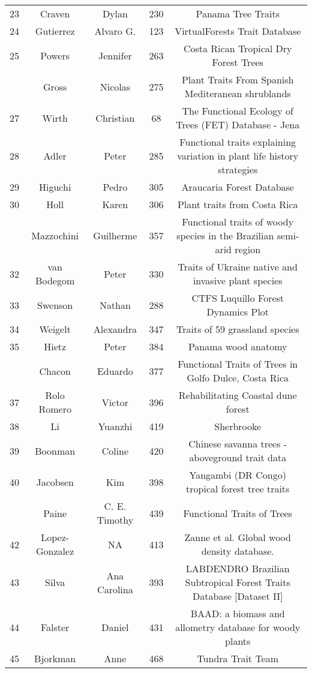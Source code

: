 \documentclass[
  12pt,
  letterpaper,
  DIV=11,
  numbers=noendperiod]{scrartcl}
\begin{document}
\begin{longtable*}[t]{ccccc}
23 & Craven & Dylan & 230 & Panama Tree Traits\\
24 & Gutierrez & Alvaro G. & 123 & VirtualForests Trait Database\\
25 & Powers & Jennifer & 263 & Costa Rican Tropical Dry Forest Trees\\
 & Gross & Nicolas & 275 & Plant Traits From Spanish Mediteranean shrublands\\
27 & Wirth & Christian & 68 & The Functional Ecology of Trees (FET) Database  - Jena\\
28 & Adler & Peter & 285 & Functional traits explaining variation in plant life history strategies\\
29 & Higuchi & Pedro & 305 & Araucaria Forest Database\\
30 & Holl & Karen & 306 & Plant traits from Costa Rica\\
 & Mazzochini & Guilherme & 357 & Functional traits of woody species in the Brazilian semi-arid region\\
32 & van Bodegom & Peter & 330 & Traits of Ukraine native and invasive plant species\\
33 & Swenson & Nathan & 288 & CTFS Luquillo Forest Dynamics Plot\\
34 & Weigelt & Alexandra & 347 & Traits of 59 grassland species\\
35 & Hietz & Peter & 384 & Panama wood anatomy\\
 & Chacon & Eduardo & 377 & Functional Traits of Trees in Golfo Dulce, Costa Rica\\
37 & Rolo Romero & Victor & 396 & Rehabilitating Coastal dune forest\\
38 & Li & Yuanzhi & 419 & Sherbrooke\\
39 & Boonman & Coline & 420 & Chinese savanna trees - aboveground trait data\\
40 & Jacobsen & Kim & 398 & Yangambi (DR Congo) tropical forest tree traits\\
 & Paine & C. E. Timothy & 439 & Functional Traits of Trees\\
42 & Lopez-Gonzalez & NA & 413 & Zanne et al. Global wood density database.\\
43 & Silva & Ana Carolina & 393 & LABDENDRO Brazilian Subtropical Forest Traits Database [Dataset II]\\
44 & Falster & Daniel & 431 & BAAD: a biomass and allometry database for woody plants\\
45 & Bjorkman & Anne & 468 & Tundra Trait Team\\

\end{longtable*}
\end{document}
